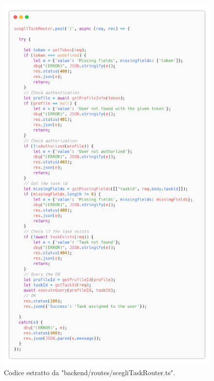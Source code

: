 \documentclass{report}
\begin{document}
\begin{figure}[H]
	\centering\includegraphics[width=1\textwidth]{images/code_scegli_task.png}
	Codice estratto da "backend/routes/scegliTaskRouter.ts".
\end{figure}
\end{document}
